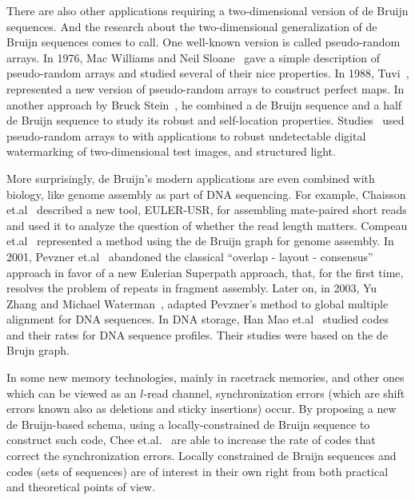 There are also other applications requiring a two-dimensional version of de Bruijn sequences. And the research about the two-dimensional generalization of de Bruijn sequences comes to call. One well-known version is called pseudo-random arrays. In 1976, Mac Williams and Neil Sloane~\cite{macwilliams1976pseudo} gave a simple description of pseudo-random arrays and studied several of their nice properties. In 1988, Tuvi~\cite{etzion1988constructions}, represented a new version of pseudo-random arrays to construct perfect maps. In another approach by Bruck Stein~\cite{bruckstein2012simple}, he combined a de Bruijn sequence and a half de Bruijn sequence to study its robust and self-location properties. Studies~\cite{hsieh2001decoding,morano1998structured,pages2005optimised,salvi2010state,van1994digital} used pseudo-random arrays to with applications to robust undetectable digital watermarking of two-dimensional test images, and structured light. 

More surprisingly, de Bruijn's modern applications are even combined with biology, like genome assembly as part of DNA sequencing. For example, Chaisson et.al~\cite{chaisson2009novo} described a new tool, EULER-USR, for assembling mate-paired short reads and used it to analyze the question of whether the read length matters. Compeau et.al~\cite{compeau2011apply} represented a method using the de Bruijn graph for genome assembly. In 2001, Pevzner et.al~\cite{pevzner2001new} abandoned the classical “overlap - layout - consensus” approach in favor of a new Eulerian Superpath approach, that, for the first time, resolves the problem of repeats in fragment assembly. Later on, in 2003, Yu Zhang and Michael Waterman~\cite{zhang2003eulerian}, adapted Pevzner's method to global multiple alignment for DNA sequences. In DNA storage, Han Mao et.al~\cite{chang2017rates,kiah2016codes} studied codes and their rates for DNA sequence profiles. Their studies were based on the de Brujn graph.

In some new memory technologies, mainly in racetrack memories, and other ones which can be viewed as an $l$-read channel, synchronization errors (which are shift errors known also as deletions and sticky insertions) occur. By proposing a new de Bruijn-based schema, using a locally-constrained de Bruijn sequence to construct such code, Chee et.al.~\cite{chee2021locally} are able to increase the rate of codes that correct the synchronization errors. Locally constrained de Bruijn sequences and codes (sets of sequences) are of interest in their own right from both practical and theoretical points of view.

